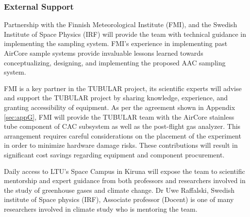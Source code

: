 \subsubsection{External Support}

Partnership with the Finnish Meteorological Institute (FMI), and the Swedish Institute of Space Physics (IRF) will provide the team with technical guidance in implementing the sampling system. FMI’s experience in implementing past AirCore sample systems provide invaluable lessons learned towards conceptualizing, designing, and implementing the proposed AAC sampling system.

FMI is a key partner in the TUBULAR project, its scientific experts will advise and support the TUBULAR project by sharing knowledge, experience, and granting accessibility of equipment. As per the agreement shown in Appendix \ref{sec:appG}, FMI will provide the TUBULAR team with the AirCore stainless tube component of CAC subsystem as well as the post-flight gas analyzer. This arrangement requires careful considerations on the placement of the experiment in order to minimize hardware damage risks. These contributions will result in significant cost savings regarding equipment and component procurement.

Daily access to LTU's Space Campus in Kiruna will expose the team to scientific mentorship and expert guidance from both professors and researchers involved in the study of greenhouse gases and climate change. Dr Uwe Raffalski, Swedish institute of Space physics (IRF), Associate professor (Docent) is one of many researchers involved in climate study who is mentoring the team.